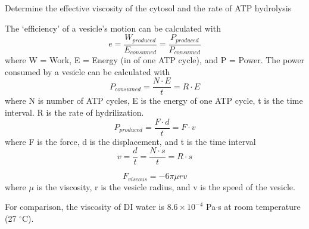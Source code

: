 Determine the effective viscosity of the cytosol and the rate of ATP hydrolysis

The `efficiency' of a vesicle's motion can be calculated with
\[e = \frac{W_{produced}}{E_{consumed}} = \frac{P_{produced}}{P_{consumed}}\]
where W = Work, E = Energy (in of one ATP cycle), and P = Power.
The power consumed by a vesicle can be calculated with
\begin{equation}
P_{consumed} = \frac{N \cdot E}{t} = R \cdot E
\end{equation}
where N is number of ATP cycles, E is the energy of one ATP cycle, t is the time interval. R is the rate of hydrilization.
\begin{equation}
P_{produced} = \frac{F \cdot d}{t} = F \cdot v
\end{equation}
where F is the force, d is the displacement, and t is the time interval
\begin{equation}
v = \frac{d}{t} = \frac{N \cdot s}{t} = R \cdot s
\end{equation} 

\begin{equation}
F_{viscous} = -6 \pi \mu r v
\end{equation}
where $\mu$ is the viscosity, r is the vesicle radius, and v is the speed of the vesicle.

For comparison, the viscosity of DI water is $8.6 \times 10^{-4}$ Pa$\cdot$s at room temperature (27 $^{\circ}$C).

